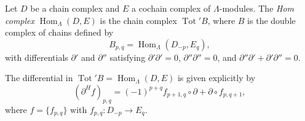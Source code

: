 Let $D$ be a chain complex and $E$ a cochain complex of $\Lambda$-modules. The \emph{Hom complex} $\operatorname{Hom}_{\Lambda}(D, E)$ is the chain complex $\operatorname{Tot}' B$, where $B$ is the double complex of chains defined by
$$B_{p,q} = \operatorname{Hom}_{\Lambda}(D_{-p}, E_q),$$
with differentials $\partial'$ and $\partial''$ satisfying $\partial' \partial' = 0$, $\partial'' \partial'' = 0$, and $\partial'' \partial' + \partial' \partial'' = 0$.

The differential in $\operatorname{Tot}' B = \operatorname{Hom}_{\Lambda}(D, E)$ is given explicitly by
$$(\partial^H f)_{p,q} = (-1)^{p+q} f_{p+1,q} \circ \partial + \partial \circ f_{p,q+1},$$
where $f = \{f_{p,q}\}$ with $f_{p,q} : D_{-p} \rightarrow E_q$.

